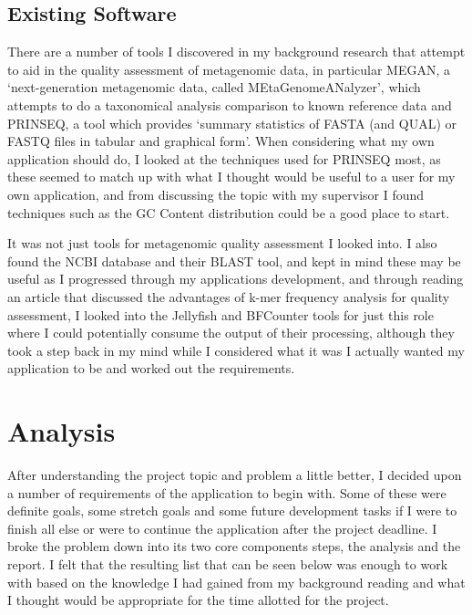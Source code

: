 \subsection{Existing Software}
There are a number of tools I discovered in my background research that attempt to aid in the quality assessment of metagenomic data, in particular MEGAN, a `next-generation metagenomic data, called MEtaGenomeANalyzer', which attempts to do a taxonomical analysis comparison to known reference data\cite{citeulike:10457549} and PRINSEQ, a tool which provides `summary statistics of FASTA (and QUAL) or FASTQ files in tabular and graphical form'\cite{citeulike:8714996}. When considering what my own application should do, I looked at the techniques used for PRINSEQ most, as these seemed to match up with what I thought would be useful to a user for my own application, and from discussing the topic with my supervisor I found techniques such as the GC Content distribution could be a good place to start.

It was not just tools for metagenomic quality assessment I looked into. I also found the NCBI database and their BLAST tool\cite{citeulike:11826724}, and kept in mind these may be useful as I progressed through my applications development, and through reading an article that discussed the advantages of k-mer frequency analysis for quality assessment, I looked into the Jellyfish\cite{citeulike:8643499} and BFCounter\cite{citeulike:9639487} tools for just this role where I could potentially consume the output of their processing, although they took a step back in my mind while I considered what it was I actually wanted my application to be and worked out the requirements.


\section{Analysis}
After understanding the project topic and problem a little better, I decided upon a number of requirements of the application to begin with. Some of these were definite goals, some stretch goals and some future development tasks if I were to finish all else or were to continue the application after the project deadline. I broke the problem down into its two core components steps, the analysis and the report. I felt that the resulting list that can be seen below was enough to work with based on the knowledge I had gained from my background reading and what I thought would be appropriate for the time allotted for the project.

